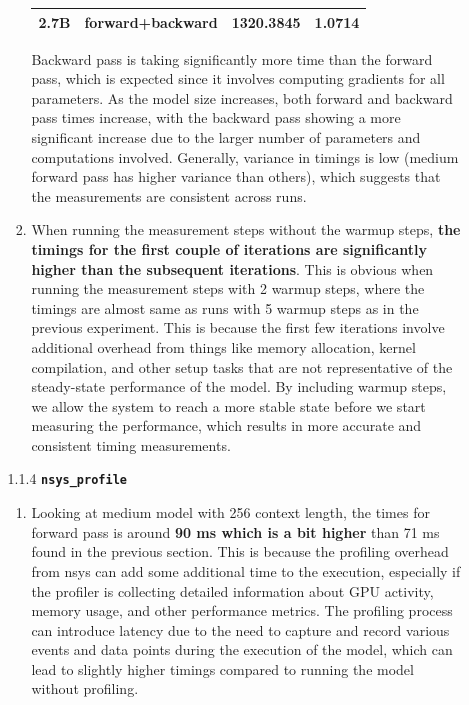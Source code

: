 \documentclass{article}
\begin{document}
\begin{enumerate}[start=1,label=\arabic*.]
\begin{enumerate}
\begin{enumerate}[label=\alph*.]
\begin{table}[h]
\begin{tabular}{|r|r|r|r|}
                                2.7B & forward+backward & 1320.3845 & 1.0714  \\
                                \hline
                            \end{tabular}
                    \end{table}
                    Backward pass is taking significantly more time than the forward pass, which is expected since it involves computing gradients for all parameters. As the model size increases, both forward and backward pass times increase, with the backward pass showing a more significant increase due to the larger number of parameters and computations involved. Generally, variance in timings is low (medium forward pass has higher variance than others), which suggests that the measurements are consistent across runs.
                \item When running the measurement steps without the warmup steps, \textbf{the timings for the first couple of iterations are significantly higher than the subsequent iterations}. This is obvious when running the measurement steps with 2 warmup steps, where the timings are almost same as runs with 5 warmup steps as in the previous experiment. This is because the first few iterations involve additional overhead from things like memory allocation, kernel compilation, and other setup tasks that are not representative of the steady-state performance of the model. By including warmup steps, we allow the system to reach a more stable state before we start measuring the performance, which results in more accurate and consistent timing measurements.
            \end{enumerate}
        \item[1.1.4] \textbf{\texttt{nsys\_profile}}
            \begin{enumerate}[label=\alph*.]
                \item Looking at medium model with 256 context length, the times for forward pass is around \textbf{90 ms which is a bit higher} than 71 ms found in the previous section. This is because the profiling overhead from nsys can add some additional time to the execution, especially if the profiler is collecting detailed information about GPU activity, memory usage, and other performance metrics. The profiling process can introduce latency due to the need to capture and record various events and data points during the execution of the model, which can lead to slightly higher timings compared to running the model without profiling.

\end{enumerate}
\end{enumerate}
\end{enumerate}
\end{document}
